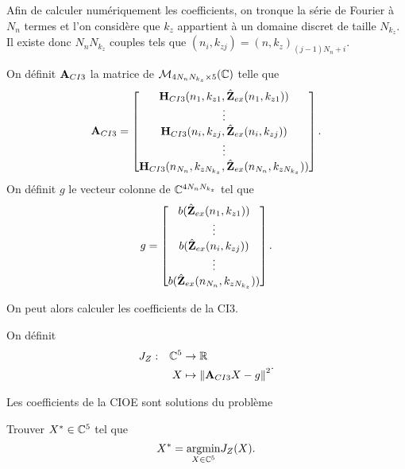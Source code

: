     Afin de calculer numériquement les coefficients, on tronque la série de Fourier à \(N_{n}\) termes et l'on considère que \(k_z\) appartient à un domaine discret de taille \(N_{k_z}\). Il existe donc \(N_{n}N_{k_z}\) couples tels que \((n_i,k_{zj}) = (n,k_z)_{(j-1)N_{n}+i}\).
    \begin{defn}
      On définit \(\mathbf{A}_{CI3}\) la matrice de \(\mathcal{M}_{4N_{n}N_{k_z}\times5}(\mathbb C)\) telle que
      \begin{equation*}
        \mathbf{A}_{CI3} = 
        \begin{bmatrix}
          \mathbf{H}_{CI3}(n_1,k_{z1},\hat{\mathbf{Z}}_{ex}(n_1,k_{z1}))
          \\
          \vdots
          \\
          \mathbf{H}_{CI3}(n_i,k_{zj},\hat{\mathbf{Z}}_{ex}(n_i,k_{zj}))
          \\
          \vdots
          \\
          \mathbf{H}_{CI3}(n_{N_n},k_{zN_{k_z}},\hat{\mathbf{Z}}_{ex}(n_{N_n},k_{zN_{k_z}}))
        \end{bmatrix}.
      \end{equation*}
      On définit \(g\) le vecteur colonne de \(\mathbb C^{4N_{n}N_{k_z}}\) tel que
      \begin{equation*}
        g = 
        \begin{bmatrix}
          b(\hat{\mathbf{Z}}_{ex}(n_1,k_{z1}))
          \\
          \vdots
          \\
          b(\hat{\mathbf{Z}}_{ex}(n_i,k_{zj}))
          \\
          \vdots
          \\
          b(\hat{\mathbf{Z}}_{ex}(n_{N_n},k_{zN_{k_z}}))
        \end{bmatrix}.
      \end{equation*}
    \end{defn}

    On peut alors calculer les coefficients de la CI3.
    \begin{defn}
      On définit
      \begin{equation*}
        \begin{aligned} &J_Z: & \mathbb C^5 &\rightarrow \mathbb R \\ & & X & \mapsto \left\lVert{\mathbf{A}}_{CI3}X - {g}\right\rVert^2 \end{aligned}.
      \end{equation*}
    \end{defn}

    \begin{thm}

      Les coefficients de la CIOE sont solutions du problème

      Trouver \(X^* \in \mathbb C^5\) tel que
      \begin{equation*}
        X^* = {\underset{X\in \mathbb C^5}{\operatorname{argmin}}}  J_Z(X).
      \end{equation*}
    \end{thm}

